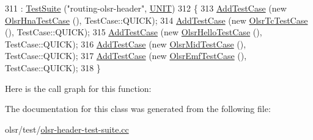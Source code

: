 \begin{DoxyCode}
311   : \hyperlink{classns3_1_1TestSuite_a904b0c40583b744d30908aeb94636d1a}{TestSuite} (\textcolor{stringliteral}{"routing-olsr-header"}, \hyperlink{classns3_1_1TestSuite_a1ebfcab34ec8161e085e8e3a1855eae0a3885375a3787abf60431f8454b3cadbd}{UNIT})
312 \{
313   \hyperlink{classns3_1_1TestCase_a3718088e3eefd5d6454569d2e0ddd835}{AddTestCase} (\textcolor{keyword}{new} \hyperlink{classOlsrHnaTestCase}{OlsrHnaTestCase} (), TestCase::QUICK);
314   \hyperlink{classns3_1_1TestCase_a3718088e3eefd5d6454569d2e0ddd835}{AddTestCase} (\textcolor{keyword}{new} \hyperlink{classOlsrTcTestCase}{OlsrTcTestCase} (), TestCase::QUICK);
315   \hyperlink{classns3_1_1TestCase_a3718088e3eefd5d6454569d2e0ddd835}{AddTestCase} (\textcolor{keyword}{new} \hyperlink{classOlsrHelloTestCase}{OlsrHelloTestCase} (), TestCase::QUICK);
316   \hyperlink{classns3_1_1TestCase_a3718088e3eefd5d6454569d2e0ddd835}{AddTestCase} (\textcolor{keyword}{new} \hyperlink{classOlsrMidTestCase}{OlsrMidTestCase} (), TestCase::QUICK);
317   \hyperlink{classns3_1_1TestCase_a3718088e3eefd5d6454569d2e0ddd835}{AddTestCase} (\textcolor{keyword}{new} \hyperlink{classOlsrEmfTestCase}{OlsrEmfTestCase} (), TestCase::QUICK);
318 \}
\end{DoxyCode}


Here is the call graph for this function\+:




The documentation for this class was generated from the following file\+:\begin{DoxyCompactItemize}
\item 
olsr/test/\hyperlink{olsr-header-test-suite_8cc}{olsr-\/header-\/test-\/suite.\+cc}\end{DoxyCompactItemize}
